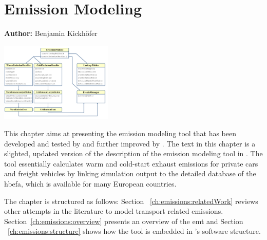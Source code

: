 \chapter{Emission Modeling}
\label{ch:emissions}

\hfill \textbf{Author:} Benjamin Kickhöfer

\begin{center} \includegraphics[width=0.4\textwidth, angle=0]{extending/figures/emissionToolOverview_pdfa.pdf} \end{center}

{\citet{HuelsmannEtAl_LAS_2011,KickhoeferEtAl_VanoutriveVerhetsel,2013KickhoeferNagel2011MappingEmissions,KickhoeferNagel2013EmissionInternalizationNETS,HuelsmannEtAl2012HotspotPricing,Kickhoefer_PhDThesis_2014,KickhoeferKern2014ExposurePricingMobilTUM}}

This chapter aims at presenting the emission modeling tool that has been developed and tested by \citet{HuelsmannEtAl_LAS_2011} and further improved by \citet{KickhoeferEtAl_VanoutriveVerhetsel_2013}. The text in this chapter is a slighted, updated version of the description of the emission modeling tool in \citet{Kickhoefer_PhDThesis_2014}.
%
The tool essentially calculates warm and cold-start exhaust emissions for private cars and freight vehicles by linking  simulation output to the detailed database of the \gls{hbefa}, which is available for many European countries.

The chapter is structured as follows:
%
Section ~\ref{ch:emissions:relatedWork} reviews other attempts in the literature to model transport related emissions. Section~\ref{ch:emissions:overview} presents an overview of the \gls{emt} and Section ~\ref{ch:emissions:structure} shows how the tool is embedded in 's software structure.

